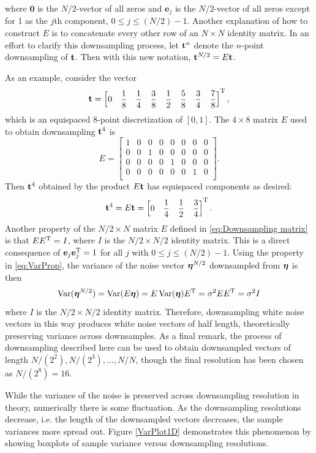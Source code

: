 where $\mathbf{0}$ is the $N/2$-vector of all zeros and $\mathbf{e}_j$ is the $N/2$-vector of all zeros except for 1 as the $j\text{th}$ component, $0 \leq j \leq (N/2)-1$. Another explanation of how to construct $E$ is to concatenate every other row of an $N \times N$ identity matrix. In an effort to clarify this downsampling process, let $\mathbf{t}^{n}$ denote the $n$-point downsampling of $\mathbf{t}$. Then with this new notation, $\mathbf{t}^{N/2} = E\mathbf{t}$. \par
As an example, consider the vector
\[\mathbf{t} = \begin{bmatrix}
0 & \dfrac{1}{8} & \dfrac{1}{4} & \dfrac{3}{8} & \dfrac{1}{2} & \dfrac{5}{8} & \dfrac{3}{4} & \dfrac{7}{8}
\end{bmatrix}^{\mathrm{T}},\]
which is an equispaced 8-point discretization of $[0,1]$. The $4 \times 8$ matrix $E$ used to obtain downsampling $\mathbf{t}^{4}$ is
\[E = \begin{bmatrix}
1 & 0 & 0 & 0 & 0 & 0 & 0 & 0 \\
0 & 0 & 1 & 0 & 0 & 0 & 0 & 0 \\
0 & 0 & 0 & 0 & 1 & 0 & 0 & 0 \\
0 & 0 & 0 & 0 & 0 & 0 & 1 & 0 \\
\end{bmatrix}.\]
Then $\mathbf{t}^4$ obtained by the product $E\mathbf{t}$ has equispaced components as desired:
\[\mathbf{t}^4 = E\mathbf{t} = \begin{bmatrix}
0 & \dfrac{1}{4} & \dfrac{1}{2} & \dfrac{3}{4}
\end{bmatrix}^{\mathrm{T}}.\]
\indent Another property of the $N/2 \times N$ matrix $E$ defined in \eqref{eq:Downsampling matrix} is that $EE^{\mathrm{T}} = I$, where $I$ is the $N/2 \times N/2$ identity matrix.  This is a direct consequence of $\mathbf{e}_j\mathbf{e}_j^{\mathrm{T}} = 1$ for all $j$ with $0 \leq j \leq (N/2)-1$. Using the property in \eqref{eq:VarProp}, the variance of the  noise vector $\bm{\eta}^{N/2}$ downsampled from $\bm{\eta}$ is then
\[\operatorname{Var}(\bm{\eta}^{N/2}) = \operatorname{Var}(E\bm{\eta}) = E\operatorname{Var}(\bm{\eta})E^{\mathrm{T}} = \sigma^2EE^{\mathrm{T}} = \sigma^2I\]
where $I$ is the $N/2 \times N/2$ identity matrix. Therefore, downsampling white noise vectors in this way produces white noise vectors of half length, theoretically preserving variance across downsamples. As a final remark, the process of downsampling described here can be used to obtain downsampled vectors of length $N/(2^2), N/(2^3), \ldots, N/N$, though the final resolution has been chosen as $N/(2^8) = 16$. \par
While the variance of the noise is preserved across downsampling resolution in theory, numerically there is some fluctuation. As the downsampling resolutions decrease, i.e. the length of the downsampled vectors decreases, the sample variances more spread out. Figure \ref{VarPlot1D} demonstrates this phenomenon by showing boxplots of sample variance versus downsampling resolutions. %

